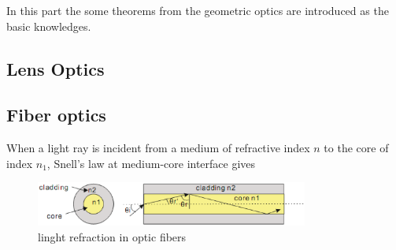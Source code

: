 In this part the  some theorems from the geometric optics  are introduced as the basic knowledges.

\subsection{Lens Optics}


\subsection{Fiber optics}
When a light ray is incident from a medium of refractive index $n$ to the core of index $n_{1}$, Snell's law at medium-core interface gives

\begin{figure}[httbp]
\centering
\includegraphics[width=0.8\textwidth]{bilder/opticfiber}
\caption{linght refraction in optic fibers}
\label{fig:opticfiber}
\end{figure}